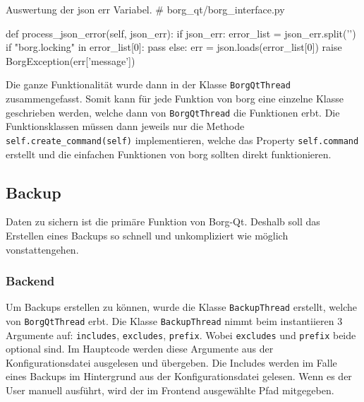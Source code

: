 \begin{sexylisting}{Auswertung der json err Variabel.}
# borg_qt/borg_interface.py

def process_json_error(self, json_err):
    if json_err:
        error_list = json_err.split('\n')
        if "borg.locking" in error_list[0]:
            pass
        else:
            err = json.loads(error_list[0])
            raise BorgException(err['message'])
\end{sexylisting}

Die ganze Funktionalität wurde dann in der Klasse \texttt{BorgQtThread}
zusammengefasst. Somit kann für jede Funktion von \gls{borg} eine einzelne Klasse
geschrieben werden, welche dann von \texttt{BorgQtThread} die Funktionen erbt. Die
Funktionsklassen müssen dann jeweils nur die Methode
\texttt{self.create\_command(self)} implementieren, welche das Property \texttt{self.command}
erstellt und die einfachen Funktionen von \gls{borg} sollten direkt funktionieren.

\subsection{Backup}
\label{sec:org89c69ff}

Daten zu sichern ist die primäre Funktion von Borg-Qt. Deshalb soll das
Erstellen eines Backups so schnell und unkompliziert wie möglich
vonstattengehen.

\subsubsection{Backend}
\label{sec:orgf0c2da8}

Um Backups erstellen zu können, wurde die Klasse \texttt{BackupThread} erstellt, welche
von \texttt{BorgQtThread} erbt. Die Klasse \texttt{BackupThread} nimmt beim instantiieren 3
Argumente auf: \texttt{includes}, \texttt{excludes}, \texttt{prefix}. Wobei \texttt{excludes} und \texttt{prefix}
beide optional sind. Im Hauptcode werden diese Argumente aus der
Konfigurationsdatei ausgelesen und übergeben. Die Includes werden im Falle
eines Backups im Hintergrund aus der Konfigurationsdatei gelesen. Wenn es
der User manuell ausführt, wird der im Frontend ausgewählte Pfad mitgegeben.

